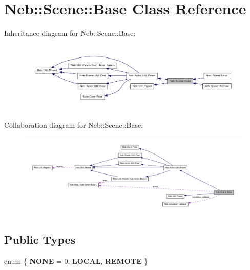 \hypertarget{classNeb_1_1Scene_1_1Base}{\section{\-Neb\-:\-:\-Scene\-:\-:\-Base \-Class \-Reference}
\label{classNeb_1_1Scene_1_1Base}
}


\-Inheritance diagram for \-Neb\-:\-:\-Scene\-:\-:\-Base\-:\nopagebreak
\begin{figure}[H]
\begin{center}
\leavevmode
\includegraphics[width=350pt]{classNeb_1_1Scene_1_1Base__inherit__graph}
\end{center}
\end{figure}


\-Collaboration diagram for \-Neb\-:\-:\-Scene\-:\-:\-Base\-:\nopagebreak
\begin{figure}[H]
\begin{center}
\leavevmode
\includegraphics[width=350pt]{classNeb_1_1Scene_1_1Base__coll__graph}
\end{center}
\end{figure}
\subsection*{\-Public \-Types}
\begin{DoxyCompactItemize}
\item 
enum \{ {\bfseries \-N\-O\-N\-E} =  0, 
{\bfseries \-L\-O\-C\-A\-L}, 
{\bfseries \-R\-E\-M\-O\-T\-E}
 \}
\end{DoxyCompactItemize}
